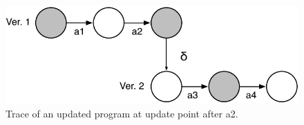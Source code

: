 \documentclass[natbib]{sigplanconf}
\begin{document}
\begin{figure}
\begin{center}
\includegraphics[scale=0.55]{updated-program-trace}
\end{center}
\caption{\label{fig:hybrid}Trace of an updated program at update point
  after a2.}



\end{figure}
\end{document}
